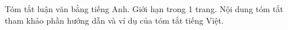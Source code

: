 Tóm tắt luận văn bằng tiếng Anh. Giới hạn trong 1 trang. Nội dung tóm tắt tham khảo phần hướng dẫn và ví dụ của tóm tắt tiếng Việt.